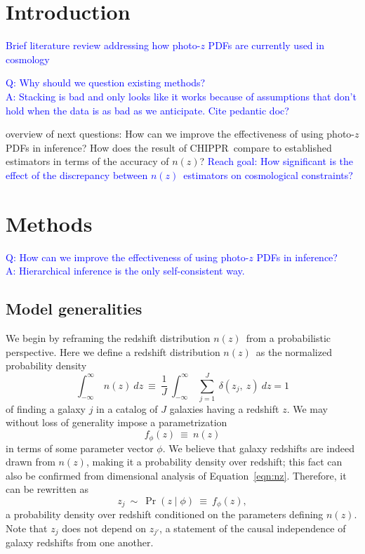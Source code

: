 \documentclass[iop]{emulateapj}
\newcommand{\chippr}{CHIPPR}
\newcommand{\nz}{$n(z)$}
\newcommand{\pzpdf}{photo-$z$ PDF}
\begin{document}
\section{Introduction}
\label{sec:introduction}

\textcolor{blue}{Brief literature review addressing how \pzpdf s are currently 
used in cosmology}


\textcolor{blue}{Q: Why should we question existing methods?\\
A: Stacking is bad and only looks like it works because of assumptions that 
don't hold when the data is as bad as we anticipate.  Cite pedantic doc?}

overview of next questions: How can we improve the effectiveness of using 
\pzpdf s in inference?  How does the result of \chippr\ compare to established 
estimators in terms of the accuracy of \nz ?
\textcolor{blue}{Reach goal: How significant is the effect of the discrepancy 
between \nz\ estimators on cosmological constraints?}

\section{Methods}
\label{sec:methods}

\textcolor{blue}{Q: How can we improve the effectiveness of using \pzpdf s in 
inference?\\
A: Hierarchical inference is the only self-consistent way.}


\subsection{Model generalities}
\label{sec:model}

We begin by reframing the redshift distribution \nz\ from a probabilistic 
perspective.
Here we define a redshift distribution \nz\ as the normalized probability 
density
\begin{equation}
\label{eqn:nz}
\int_{-\infty}^{\infty}\ n(z)\ dz\ \equiv\ \frac{1}{J}\ 
\int_{-\infty}^{\infty}\ \sum_{j=1}^{J}\ \delta(z_{j},\ z)\ dz = 1
\end{equation}
of finding a galaxy $j$ in a catalog of $J$ galaxies having a redshift $z$.
We may without loss of generality impose a parametrization
\begin{equation}
\label{eqn:fz}
f_{\phi}(z)\ \equiv\ n(z)
\end{equation}
in terms of some parameter vector $\phi$.
We believe that galaxy redshifts are indeed drawn from \nz, making it a 
probability density over redshift; this fact can also be confirmed from 
dimensional analysis of Equation~\ref{eqn:nz}.
Therefore, it can be rewritten as
\begin{equation}
\label{eqn:pz}
z_{j}\ \sim\ \Pr(z \mid \phi)\ \equiv\ f_{\phi}(z),
\end{equation}
a probability density over redshift conditioned on the parameters defining \nz.
Note that $z_{j}$ does not depend on $z_{j'}$, a statement of the causal 
independence of galaxy redshifts from one another.
\end{document}

